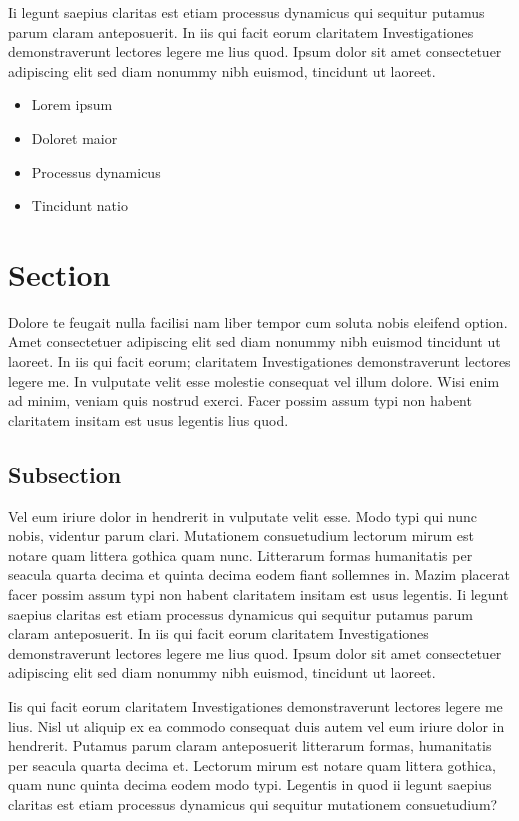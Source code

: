 \documentclass[a4paper,12pt]{scrartcl}
\begin{document}
 Ii legunt saepius claritas est etiam processus dynamicus qui sequitur putamus parum claram anteposuerit. In iis qui facit eorum claritatem Investigationes demonstraverunt lectores legere me lius quod. Ipsum dolor sit amet consectetuer adipiscing elit sed diam nonummy nibh euismod, tincidunt ut laoreet.
 
 
 \begin{itemize}
\item Lorem ipsum
\item Doloret maior
\item Processus dynamicus
\item Tincidunt natio

\end{itemize}


\section{Section}
Dolore te feugait nulla facilisi nam liber tempor cum soluta nobis eleifend option. Amet consectetuer adipiscing elit sed diam nonummy nibh euismod tincidunt ut laoreet. In iis qui facit eorum; claritatem Investigationes demonstraverunt lectores legere me. In vulputate velit esse molestie consequat vel illum dolore. Wisi enim ad minim, veniam quis nostrud exerci. Facer possim assum typi non habent claritatem insitam est usus legentis lius quod.

\subsection{Subsection}
Vel eum iriure dolor in hendrerit in vulputate velit esse. Modo typi qui nunc nobis, videntur parum clari. Mutationem consuetudium lectorum mirum est notare quam littera gothica quam nunc. Litterarum formas humanitatis per seacula quarta decima et quinta decima eodem fiant sollemnes in. Mazim placerat facer possim assum typi non habent claritatem insitam est usus legentis. Ii legunt saepius claritas est etiam processus dynamicus qui sequitur putamus parum claram anteposuerit. In iis qui facit eorum claritatem Investigationes demonstraverunt lectores legere me lius quod. Ipsum dolor sit amet consectetuer adipiscing elit sed diam nonummy nibh euismod, tincidunt ut laoreet.

Iis qui facit eorum claritatem Investigationes demonstraverunt lectores legere me lius. Nisl ut aliquip ex ea commodo consequat duis autem vel eum iriure dolor in hendrerit. Putamus parum claram anteposuerit litterarum formas, humanitatis per seacula quarta decima et. Lectorum mirum est notare quam littera gothica, quam nunc quinta decima eodem modo typi. Legentis in quod ii legunt saepius claritas est etiam processus dynamicus qui sequitur mutationem consuetudium?
\end{document}

